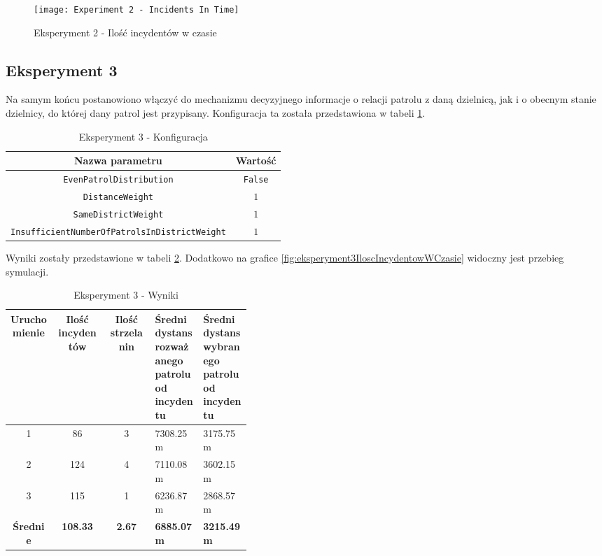 \begin{figure}[H]
    \centering
    \texttt{[image: Experiment 2 - Incidents In Time]}
    \caption{Eksperyment 2 - Ilość incydentów w czasie}
    \label{fig:eksperyment2IloscIncydentowWCzasie}
\end{figure}

\subsection{Eksperyment 3}

\par Na samym końcu postanowiono włączyć do mechanizmu decyzyjnego informacje o relacji patrolu z daną dzielnicą, jak i o obecnym stanie dzielnicy, do której dany patrol jest przypisany. Konfiguracja ta została przedstawiona w tabeli \ref{tab:eksperyment3Konfiguracja}.

\begin{table}[H]
    \centering
    \begin{tabular}{|c|c|}
        \hline
        Nazwa parametru & Wartość \\
        \hline
        \hline
         \texttt{EvenPatrolDistribution} & \texttt{False} \\
         \hline
         \texttt{DistanceWeight} & $1$ \\
         \hline
         \texttt{SameDistrictWeight} & $1$ \\
         \hline
         \texttt{InsufficientNumberOfPatrolsInDistrictWeight} & $1$ \\
         \hline
    \end{tabular}
    \caption{Eksperyment 3 - Konfiguracja}
    \label{tab:eksperyment3Konfiguracja}
\end{table}

Wyniki zostały przedstawione w tabeli \ref{tab:eksperyment3Wyniki}. Dodatkowo na grafice \ref{fig:eksperyment3IloscIncydentowWCzasie} widoczny jest przebieg symulacji.

\begin{table}[H]
    \centering
    \begin{tabular}{|c|c|c|p{0.2\linewidth}|p{0.2\linewidth}|}
        \hline
        Uruchomienie & Ilość incydentów & Ilość strzelanin & Średni dystans rozważanego patrolu od incydentu & Średni dystans wybranego patrolu od incydentu \\
        \hline
        \hline
        1 & 86 & 3 & 7308.25m & 3175.75m \\
        \hline
        2 & 124 & 4 & 7110.08m & 3602.15m \\
        \hline
        3 & 115 & 1 & 6236.87m & 2868.57m \\
        \hline
        \hline
        \textbf{Średnie} & \textbf{108.33} & \textbf{2.67} & \textbf{6885.07m} & \textbf{3215.49m} \\
        \hline
    \end{tabular}
    \caption{Eksperyment 3 - Wyniki}
    \label{tab:eksperyment3Wyniki}
\end{table}

